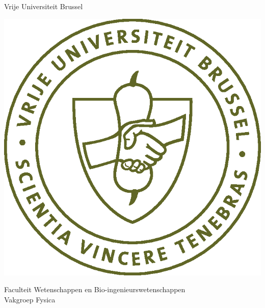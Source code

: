%
%
\thispagestyle{empty}


\vspace*{-5mm}
\begin{minipage}{\textwidth}
  \begin{center}
    \begin{Large}
      Vrije Universiteit Brussel\\[6mm]
    \end{Large}
    \includegraphics[width=0.4 \textwidth]{FrontMatter/vublogo}\\[6mm]
    \begin{large}
      Faculteit Wetenschappen en Bio-ingenieurswetenschappen\\
      Vakgroep Fysica\\
    \end{large}
  \end{center}
\end{minipage}

